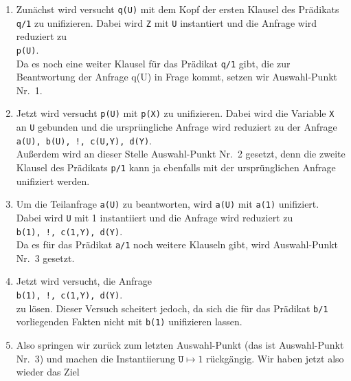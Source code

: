 \begin{enumerate}
\item Zun\"{a}chst wird versucht \texttt{q(U)} mit dem Kopf der ersten Klausel 
      des Pr\"{a}dikats \texttt{q/1}  zu unifizieren.  Dabei wird \texttt{Z} mit
      \texttt{U} instantiert und die Anfrage wird reduziert zu \\[0.1cm]
      \hspace*{1.3cm} \texttt{p(U)}. \\[0.1cm]
      Da es noch eine weiter Klausel f\"{u}r das Pr\"{a}dikat \texttt{q/1} gibt, die zur
      Beantwortung der Anfrage q(U) in Frage kommt, setzen wir Auswahl-Punkt Nr.~1.
\item Jetzt wird versucht \texttt{p(U)} mit \texttt{p(X)} zu unifizieren.  Dabei
      wird die Variable \texttt{X} an \texttt{U} gebunden und die urspr\"{u}ngliche Anfrage
      wird reduziert zu der Anfrage \\[0.1cm]
      \hspace*{1.3cm}  
      \texttt{a(U), b(U), !, c(U,Y), d(Y)}. \\[0.1cm]
      Außerdem wird an dieser Stelle Auswahl-Punkt Nr.~2 gesetzt, denn die zweite Klausel
      des Pr\"{a}dikats \texttt{p/1} kann ja ebenfalls mit der urspr\"{u}nglichen Anfrage unifiziert
      werden. 
\item Um die Teilanfrage \texttt{a(U)} zu beantworten, wird \texttt{a(U)} mit
      \texttt{a(1)} unifiziert.  Dabei wird \texttt{U} mit 1 instantiiert und die Anfrage wird reduziert zu \\[0.1cm]
      \hspace*{1.3cm} 
      \texttt{b(1), !, c(1,Y), d(Y)}. \\[0.1cm]
      Da es f\"{u}r das Pr\"{a}dikat \texttt{a/1} noch weitere Klauseln gibt, wird Auswahl-Punkt Nr.~3
      gesetzt.
\item Jetzt wird versucht, die Anfrage \\[0.1cm]
      \hspace*{1.3cm}    \texttt{b(1), !, c(1,Y), d(Y)}. \\[0.1cm]
      zu l\"{o}sen.  Dieser Versuch scheitert jedoch, da sich die f\"{u}r das Pr\"{a}dikat \texttt{b/1}
      vorliegenden Fakten nicht mit \texttt{b(1)} unifizieren lassen.
\item Also springen wir zur\"{u}ck zum letzten Auswahl-Punkt (das ist Auswahl-Punkt Nr.~3)
      und machen die Instantiierung 
      $\texttt{U} \mapsto 1$ r\"{u}ckg\"{a}ngig.  Wir haben jetzt also wieder das Ziel \\[0.1cm]

\end{enumerate}

